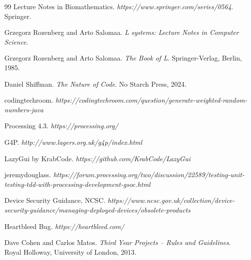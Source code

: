\documentclass[]{final_report}
\begin{document}
\begin{thebibliography}{99}
 Lecture Notes in Biomathematics. \emph{https://www.springer.com/series/0564}. Springer.

 Grzegorz Rozenberg and Arto Salomaa. \emph{L systems: Lecture Notes in Computer Science}. 

 Grzegorz Rozenberg and Arto Salomaa. \emph{The Book of L}. Springer-Verlag, Berlin, 1985.

 Daniel Shiffman. \emph{The Nature of Code}. No Starch Press, 2024.

 codingtechroom. \emph{https://codingtechroom.com/question/generate-weighted-random-numbers-java}

 Processing 4.3. \emph{https://processing.org/}

 G4P. \emph{http://www.lagers.org.uk/g4p/index.html}

 LazyGui by KrabCode. \emph{https://github.com/KrabCode/LazyGui}

 jeremydouglass. \emph{https://forum.processing.org/two/discussion/22589/testing-unit-testing-tdd-with-processing-development-gsoc.html}

 Device Security Guidance, NCSC. \emph{https://www.ncsc.gov.uk/collection/device-security-guidance/managing-deployed-devices/obsolete-products}

 Heartbleed Bug. \emph{https://heartbleed.com/}

 Dave Cohen and Carlos Matos. \emph{Third Year Projects -- Rules and Guidelines}. Royal Holloway, University of London, 2013.
\end{thebibliography}
\label{endpage}
\end{document}
